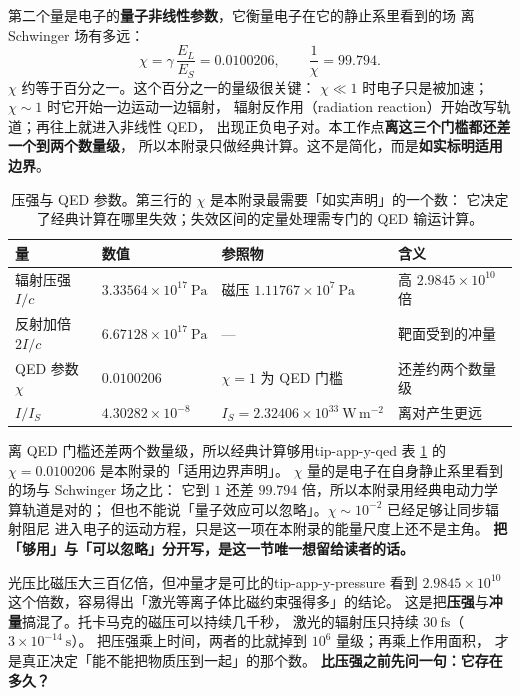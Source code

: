 第二个量是电子的\textbf{量子非线性参数}，它衡量电子在它的静止系里看到的场
离 Schwinger 场有多远：
\begin{equation}
\chi = \gamma\,\frac{E_L}{E_S} = 0.0100206,
\qquad
\frac{1}{\chi} = 99.794.
\label{eq:app-y-ratio2}
\end{equation}
$\chi$ 约等于百分之一。这个百分之一的量级很关键：
$\chi\ll1$ 时电子只是被加速；$\chi\sim1$ 时它开始一边运动一边辐射，
辐射反作用（radiation reaction）开始改写轨道；再往上就进入非线性 QED，
出现正负电子对。本工作点\textbf{离这三个门槛都还差一个到两个数量级}，
所以本附录只做经典计算。这不是简化，而是\textbf{如实标明适用边界}。

\begin{table}[htbp]
\centering
\small
\caption{压强与 QED 参数。第三行的 $\chi$ 是本附录最需要「如实声明」的一个数：
它决定了经典计算在哪里失效；失效区间的定量处理需专门的 QED 输运计算。}
\label{tab:app-y-qed}
\begin{tabular}{p{3.2cm}p{3.6cm}p{3.3cm}p{3.2cm}}
\toprule
量 & 数值 & 参照物 & 含义 \\
\midrule
辐射压强 $I/c$ & $3.33564\times10^{17}\ \mathrm{Pa}$ & 磁压 $1.11767\times10^{7}\ \mathrm{Pa}$ & 高 $2.9845\times10^{10}$ 倍 \\
反射加倍 $2I/c$ & $6.67128\times10^{17}\ \mathrm{Pa}$ & --- & 靶面受到的冲量 \\
QED 参数 $\chi$ & $0.0100206$ & $\chi=1$ 为 QED 门槛 & 还差约两个数量级 \\
$I/I_S$ & $4.30282\times10^{-8}$ & $I_S = 2.32406\times10^{33}\ \mathrm{W\,m^{-2}}$ & 离对产生更远 \\
\bottomrule
\end{tabular}

\end{table}

\begin{tip}{离 QED 门槛还差两个数量级，所以经典计算够用}{tip-app-y-qed}
表 \ref{tab:app-y-qed} 的 $\chi=0.0100206$ 是本附录的「适用边界声明」。
$\chi$ 量的是电子在自身静止系里看到的场与 Schwinger 场之比：
它到 $1$ 还差 $99.794$ 倍，所以本附录用经典电动力学算轨道是对的；
但也不能说「量子效应可以忽略」。$\chi\sim10^{-2}$ 已经足够让同步辐射阻尼
进入电子的运动方程，只是这一项在本附录的能量尺度上还不是主角。
\textbf{把「够用」与「可以忽略」分开写，是这一节唯一想留给读者的话。}
\end{tip}

\begin{tip}{光压比磁压大三百亿倍，但冲量才是可比的}{tip-app-y-pressure}
看到 $2.9845\times10^{10}$ 这个倍数，容易得出「激光等离子体比磁约束强得多」的结论。
这是把\textbf{压强}与\textbf{冲量}搞混了。托卡马克的磁压可以持续几千秒，
激光的辐射压只持续 $30\ \mathrm{fs}$（$3\times10^{-14}\ \mathrm{s}$）。
把压强乘上时间，两者的比就掉到 $10^{6}$ 量级；再乘上作用面积，
才是真正决定「能不能把物质压到一起」的那个数。
\textbf{比压强之前先问一句：它存在多久？}
\end{tip}

